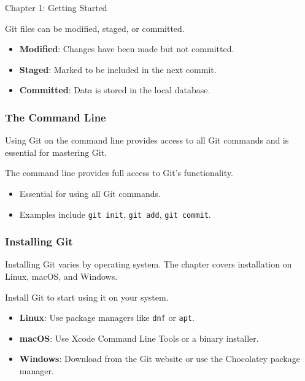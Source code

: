 \begin{notes}{Chapter 1: Getting Started}
\begin{highlight}
        Git files can be modified, staged, or committed.
        
        \begin{itemize}
            \item \textbf{Modified}: Changes have been made but not committed.
            \item \textbf{Staged}: Marked to be included in the next commit.
            \item \textbf{Committed}: Data is stored in the local database.
        \end{itemize}
    
    \end{highlight}
    
    \subsubsection*{The Command Line}
    
    Using Git on the command line provides access to all Git commands and is essential for mastering Git.
    
    \begin{highlight}
    
        The command line provides full access to Git's functionality.
        
        \begin{itemize}
            \item Essential for using all Git commands.
            \item Examples include \texttt{git init}, \texttt{git add}, \texttt{git commit}.
        \end{itemize}
    
    \end{highlight}
    
    \subsubsection*{Installing Git}
    
    Installing Git varies by operating system. The chapter covers installation on Linux, macOS, and Windows.
    
    \begin{highlight}
    
        Install Git to start using it on your system.
        
        \begin{itemize}
            \item \textbf{Linux}: Use package managers like \texttt{dnf} or \texttt{apt}.
            \item \textbf{macOS}: Use Xcode Command Line Tools or a binary installer.
            \item \textbf{Windows}: Download from the Git website or use the Chocolatey package manager.
        \end{itemize}
    

\end{highlight}
\end{notes}
